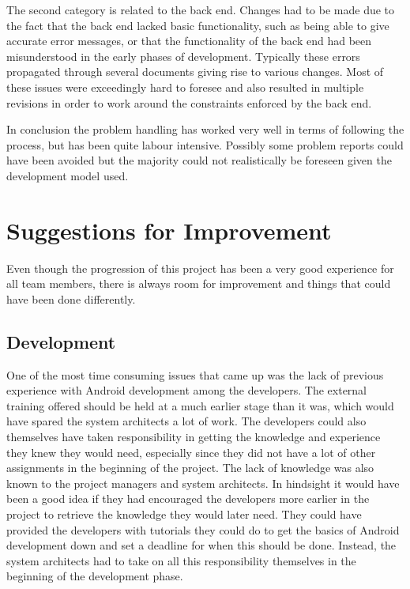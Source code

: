 \documentclass[a4paper]{article}
\begin{document}
The second category is related to the back end. Changes had to be made due to the fact that the back end lacked basic functionality, such as being able to give accurate error messages, or that the functionality of the back end had been misunderstood in the early phases of development. Typically these errors propagated through several documents giving rise to various changes. Most of these issues were exceedingly hard to foresee and also resulted in multiple revisions in order to work around the constraints enforced by the back end.

In conclusion the problem handling has worked very well in terms of following the process, but has been quite labour intensive. Possibly some problem reports could have been avoided but the majority could not realistically be foreseen given the development model used. 

\section{Suggestions for Improvement}
\label{sec:impr}

Even though the progression of this project has been a very good experience for all team members, there is always room for improvement and things that could have been done differently.

\subsection{Development}
One of the most time consuming issues that came up was the lack of previous experience with Android development among the developers. The external training offered should be held at a much earlier stage than it was, which would have spared the system architects a lot of work. The developers could also themselves have taken responsibility in getting the knowledge and experience they knew they would need, especially since they did not have a lot of other assignments in the beginning of the project. The lack of knowledge was also known to the project managers and system architects. In hindsight it would have been a good idea if they had encouraged the developers more earlier in the project to retrieve the knowledge they would later need. They could have provided the developers with tutorials they could do to get the basics of Android development down and set a deadline for when this should be done. Instead, the system architects had to take on all this responsibility themselves in the beginning of the development phase. 
\end{document}
